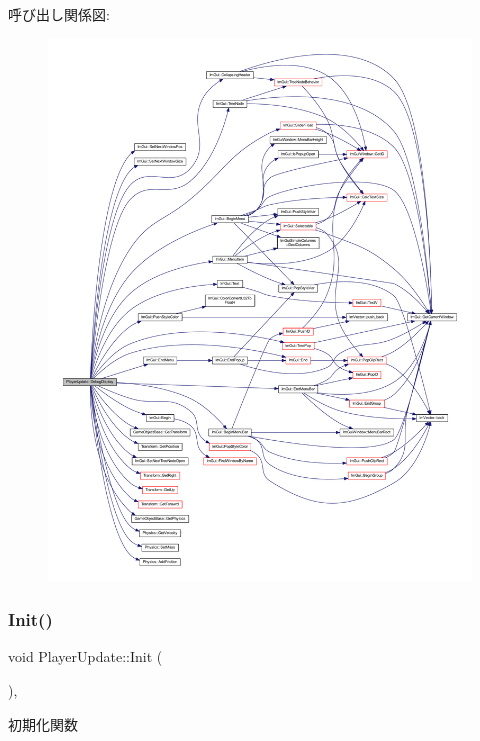 呼び出し関係図\+:\nopagebreak
\begin{figure}[H]
\begin{center}
\leavevmode
\includegraphics[width=350pt]{class_player_update_ac15fd0faf356c6e66f6c62c2b6b8d3ac_cgraph}
\end{center}
\end{figure}
\mbox{\label{class_player_update_ac72b39db7b7bfaf094bde9ed1adef4b7}} 
\subsubsection{\texorpdfstring{Init()}{Init()}}
{\footnotesize\ttfamily void Player\+Update\+::\+Init (\begin{DoxyParamCaption}{ }\end{DoxyParamCaption})\hspace{0.3cm}{\ttfamily [override]}, {\ttfamily [virtual]}}



初期化関数 



